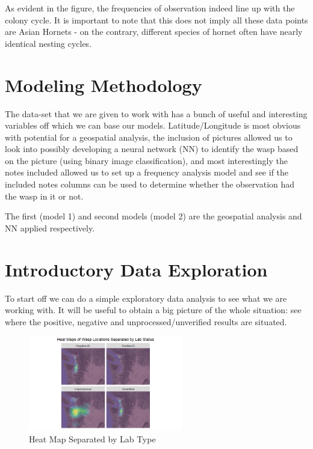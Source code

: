 \documentclass[letterpaper]{article}
\begin{document}
As evident in the figure, the frequencies of observation indeed line up with the colony cycle. It is important to note that this does not imply all these data points are Asian Hornets - on the contrary, different species of hornet often have nearly identical nesting cycles.

\section{Modeling Methodology}

The data-set that we are given to work with has a bunch of useful and interesting variables off which we can base our models. Latitude/Longitude is most obvious with potential for a geospatial analysis, the inclusion of pictures allowed us to look into possibly developing a neural network (NN) to identify the wasp based on the picture (using binary image classification), and most interestingly the notes included allowed us to set up a frequency analysis model and see if the included notes columns can be used to determine whether the observation had the wasp in it or not.

The first (model 1) and second models (model 2) are the geospatial analysis and NN applied respectively.

\section{Introductory Data Exploration}

To start off we can do a simple exploratory data analysis to see what we are working with. It will be useful to obtain a big picture of the whole situation: see where the positive, negative and unprocessed/unverified results are situated. 

\begin{figure}[H]
    \centering
    \includegraphics[width=0.6\textwidth]{images/facet_full.png}
    \caption{Heat Map Separated by Lab Type}
\end{figure}
\end{document}
